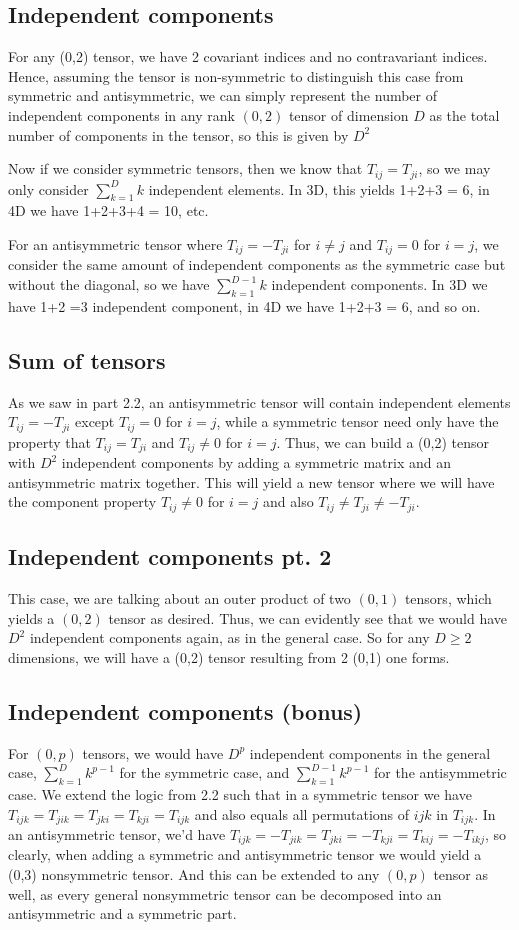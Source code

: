 \documentclass{article}
\begin{document}
		\pagebreak	
		\subsection{Independent components}
			For any (0,2) tensor, we have 2 covariant indices and no contravariant indices. Hence, assuming the tensor is non-symmetric to distinguish this case from symmetric and antisymmetric, we can simply represent the number of independent components in any rank $(0,2)$ tensor of dimension $D$ as the total number of components in the tensor, so this is given by $D^2$
			
			Now if we consider symmetric tensors, then we know that $T_{ij} = T_{ji}$, so we may only consider $\sum_{k=1}^{D} k$ independent elements. In 3D, this yields 1+2+3 = 6, in 4D we have 1+2+3+4 = 10, etc.
			
			For an antisymmetric tensor where $T_{ij} = -T_{ji}$ for $i\neq j$ and $T_{ij} = 0$ for $i=j$, we consider the same amount of independent components as the symmetric case but without the diagonal, so we have $\sum_{k=1}^{D-1} k$ independent components. In 3D we have 1+2 =3 independent component, in 4D we have 1+2+3 = 6, and so on.
		\subsection{Sum of tensors}
			As we saw in part 2.2, an antisymmetric tensor will contain independent elements $T_{ij} = -T_{ji}$ except $T_{ij} = 0$ for $i=j$, while a symmetric tensor need only have the property that $T_{ij} = T_{ji}$ and $T_{ij} \neq 0$ for $i=j$. Thus, we can build a (0,2) tensor with $D^2$ independent components by adding a symmetric matrix and an antisymmetric matrix together. This will yield a new tensor where we will have the component property $T_{ij} \neq 0$ for $i=j$ and also $T_{ij} \neq T_{ji} \neq -T_{ji}$.
		\subsection{Independent components pt. 2}
			This case, we are talking about an outer product of two $(0,1)$ tensors, which yields a $(0,2)$ tensor as desired. Thus, we can evidently see that we would have $D^2$ independent components again, as in the general case. So for any $D \geq 2$ dimensions, we will have a (0,2) tensor resulting from 2 (0,1) one forms.
		\subsection{Independent components (bonus)}
			For $(0,p)$ tensors, we would have $D^p$ independent components in the general case, $\sum_{k=1}^D k^{p-1}$ for the symmetric case, and $\sum_{k=1}^{D-1} k^{p-1}$ for the antisymmetric case. We extend the logic from 2.2 such that in a symmetric tensor we have $T_{ijk} = T_{jik} = T_{jki} = T_{kji} = T_{ijk}$ and also equals all permutations of $ijk$ in $T_{ijk}$. In an antisymmetric tensor, we'd have $T_{ijk} = - T_{jik} = T_{jki} = -T_{kji} = T_{kij} = -T_{ikj}$, so clearly, when adding a symmetric and antisymmetric tensor we would yield a (0,3) nonsymmetric tensor. And this can be extended to any $(0,p)$ tensor as well, as every general nonsymmetric tensor can be decomposed into an antisymmetric and a symmetric part.
\end{document}
